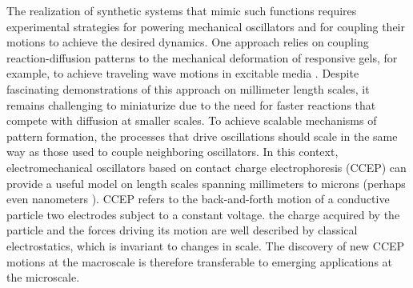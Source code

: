 The realization of synthetic systems that mimic such functions requires experimental strategies for powering mechanical oscillators and for coupling their motions to achieve the desired dynamics. One approach relies on coupling reaction-diffusion patterns to the mechanical deformation of responsive gels, for example, to achieve traveling wave motions in excitable media \autocite{Masuda2016}. Despite fascinating demonstrations of this approach on millimeter length scales, it remains challenging to miniaturize due to the need for faster reactions that compete with diffusion at smaller scales. To achieve scalable mechanisms of pattern formation, the processes that drive oscillations should scale in the same way as those used to couple neighboring oscillators. In this context, electromechanical oscillators based on contact charge electrophoresis (CCEP) \autocite{bishop2018contact,drews2015contact} can provide a useful model on length scales spanning millimeters\autocite{Mersch2011} to microns\autocite{Dou2016} (perhaps even nanometers \autocite{Park2000,Kowalik2016}).
CCEP refers to the back-and-forth motion of a conductive particle  two electrodes subject to a constant voltage.  the charge acquired by the particle and the forces driving its motion are well described by classical electrostatics, which is invariant to changes in scale. The discovery of new CCEP motions at the macroscale is therefore transferable to emerging applications at the microscale\autocite{bishop2018contact}.
